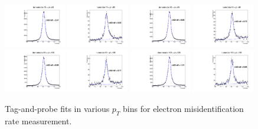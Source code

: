 \documentclass[thesis.tex]{subfiles}
\renewcommand\_{\textunderscore\allowbreak}
\begin{document}
\begin{figure}[hbtp]
   \includegraphics[width=0.24\textwidth]{Figures/Bw_ker_pt_den_75_80.pdf}  \includegraphics[width=0.24\textwidth]{Figures/Bw_ker_pt_num_75_80.pdf}   \includegraphics[width=0.24\textwidth]{Figures/Bw_ker_pt_den_80_90.pdf} \includegraphics[width=0.24\textwidth]{Figures/Bw_ker_pt_num_80_90.pdf} \\
    \includegraphics[width=0.24\textwidth]{Figures/Bw_ker_pt_den_90_100.pdf}  \includegraphics[width=0.24\textwidth]{Figures/Bw_ker_pt_num_90_100.pdf}   \includegraphics[width=0.24\textwidth]{Figures/Bw_ker_pt_den_100_120.pdf} \includegraphics[width=0.24\textwidth]{Figures/Bw_ker_pt_num_100_120.pdf} \\
  \caption{Tag-and-probe fits in various $p_T$ bins for electron misidentification rate measurement. }
 \label{fig:fitAllele}
\end{figure}
\end{document}
